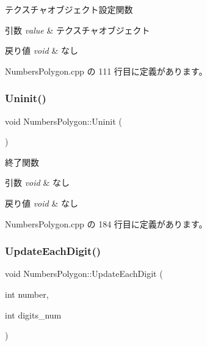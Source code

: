 テクスチャオブジェクト設定関数 


\begin{DoxyParams}{引数}
{\em value} & テクスチャオブジェクト \\
\hline
\end{DoxyParams}

\begin{DoxyRetVals}{戻り値}
{\em void} & なし \\
\hline
\end{DoxyRetVals}


 Numbers\+Polygon.\+cpp の 111 行目に定義があります。

\mbox{\label{class_numbers_polygon_a0e5a9af5b25704ba21b80e235d913f86}} 
\subsubsection{\texorpdfstring{Uninit()}{Uninit()}}
{\footnotesize\ttfamily void Numbers\+Polygon\+::\+Uninit (\begin{DoxyParamCaption}{ }\end{DoxyParamCaption})}



終了関数 


\begin{DoxyParams}{引数}
{\em void} & なし \\
\hline
\end{DoxyParams}

\begin{DoxyRetVals}{戻り値}
{\em void} & なし \\
\hline
\end{DoxyRetVals}


 Numbers\+Polygon.\+cpp の 184 行目に定義があります。

\mbox{\label{class_numbers_polygon_a2dd5cc3613e90c5e7db7cf8428ed5026}} 
\subsubsection{\texorpdfstring{Update\+Each\+Digit()}{UpdateEachDigit()}}
{\footnotesize\ttfamily void Numbers\+Polygon\+::\+Update\+Each\+Digit (\begin{DoxyParamCaption}\item[{int}]{number,  }\item[{int}]{digits\+\_\+num }\end{DoxyParamCaption})\hspace{0.3cm}{\ttfamily [private]}}




